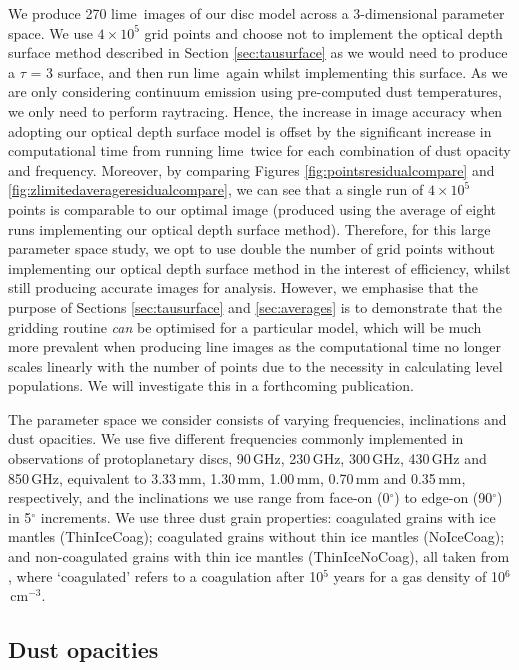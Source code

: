 \documentclass[fleqn,usenatbib]{mnras}
\newcommand{\lime}{{\sc lime}}
\begin{document}
We produce 270 \lime\ images of our disc model across a 3-dimensional parameter space. We use $4 \times 10^5$ grid points and choose not to implement the optical depth surface method described in Section \ref{sec:tausurface} as we would need to produce a $\tau$ = 3 surface, and then run \lime\ again whilst implementing this surface. As we are only considering continuum emission using pre-computed dust temperatures, we only need to perform raytracing. Hence, the increase in image accuracy when adopting our optical depth surface model is offset by the significant increase in computational time from running \lime\ twice for each combination of dust opacity and frequency. Moreover, by comparing Figures \ref{fig:pointsresidualcompare} and \ref{fig:zlimitedaverageresidualcompare}, we can see that a single run of $4 \times 10^5$ points is comparable to our optimal image (produced using the average of eight runs implementing our optical depth surface method). Therefore, for this large parameter space study, we opt to use double the number of grid points without implementing our optical depth surface method in the interest of efficiency, whilst still producing accurate images for analysis. However, we emphasise that the purpose of Sections \ref{sec:tausurface} and \ref{sec:averages} is to demonstrate that the gridding routine \textit{can} be optimised for a particular model, which will be much more prevalent when producing line images as the computational time no longer scales linearly with the number of points due to the necessity in calculating level populations. We will investigate this in a forthcoming publication.

\smallskip

The parameter space we consider consists of varying frequencies, inclinations and dust opacities. We use five different frequencies commonly implemented in observations of protoplanetary discs, 90\,GHz, 230\,GHz, 300\,GHz, 430\,GHz and 850\,GHz, equivalent to 3.33\,mm, 1.30\,mm, 1.00\,mm, 0.70\,mm and 0.35\,mm, respectively, and the inclinations we use range from face-on (0$^{\circ}$) to edge-on (90$^{\circ}$) in 5$^{\circ}$ increments. We use three dust grain properties: coagulated grains with ice mantles (ThinIceCoag); coagulated grains without thin ice mantles (NoIceCoag); and non-coagulated grains with thin ice mantles (ThinIceNoCoag), all taken from \citet{Ossenkopf&Henning1994}, where `coagulated' refers to a coagulation after 10$^5$ years for a gas density of 10$^6$\,cm$^{-3}$. 

\subsection{Dust opacities}
\end{document}
